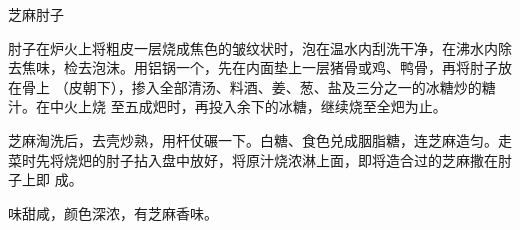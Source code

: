 \begin{recipe}{芝麻肘子}

\ingredients


\preparation

\step 肘子在炉火上将粗皮一层烧成焦色的皱纹状时，泡在温水内刮洗干净，在沸水内除
去焦味，检去泡沫。用铝锅一个，先在内面垫上一层猪骨或鸡、鸭骨，再将肘子放在骨上
（皮朝下），掺入全部清汤、料酒、姜、葱、盐及三分之一的冰糖炒的糖汁。在中火上烧
至五成𤆵时，再投入余下的冰糖，继续烧至全𤆵为止。

\step 芝麻淘洗后，去壳炒熟，用杆仗碾一下。白糖、食色兑成胭脂糖，连芝麻造匀。走
菜时先将烧𤆵的肘子拈入盘中放好，将原汁烧浓淋上面，即将造合过的芝麻撒在肘子上即
成。

\features

味甜咸，颜色深浓，有芝麻香味。

\end{recipe}

